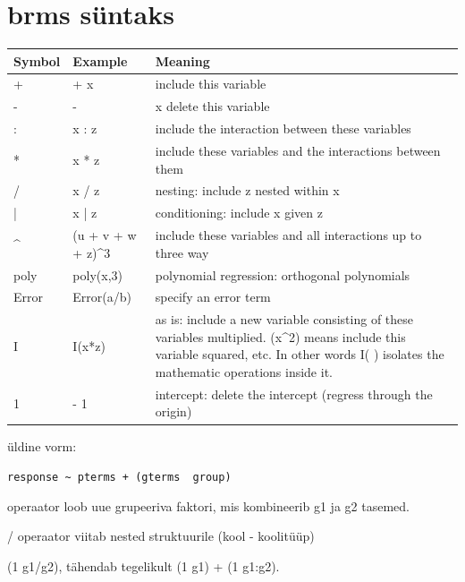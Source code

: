 \documentclass[]{book}
\providecommand{\tightlist}{%
  \setlength{\itemsep}{0pt}\setlength{\parskip}{0pt}}
\begin{document}
\hypertarget{brms-suntaks}{%
\chapter{brms süntaks}\label{brms-suntaks}}

\begin{tabular}{l|l|l}
\hline
Symbol & Example & Meaning\\
\hline
+ & + x & include this variable\\
\hline
- & - & x   delete this variable\\
\hline
: & x : z & include the interaction between these variables\\
\hline
* & x * z & include these variables and the interactions between them\\
\hline
/ & x / z & nesting: include z nested within x\\
\hline
| & x | z & conditioning: include x given z\\
\hline
\textasciicircum{} & (u + v + w + z)\textasciicircum{}3 & include these variables and all interactions up to three way\\
\hline
poly & poly(x,3) & polynomial regression: orthogonal polynomials\\
\hline
Error & Error(a/b) & specify an error term\\
\hline
I & I(x*z) & as is: include a new variable consisting of these variables multiplied. (x\textasciicircum{}2) means include this variable squared, etc. In other words I( ) isolates the mathematic operations inside it.\\
\hline
1 & - 1 & intercept: delete the intercept (regress through the origin)\\
\hline
\end{tabular}

üldine vorm:

\texttt{response\ \textasciitilde{}\ pterms\ +\ (gterms\ \textbar{}\ group)}

\begin{description}
\tightlist
\item[kasuta g1:g2 või g1/g2, kui nii g1 kui g2 on sobilikud grupeerivad faktorid.]
operaator loob uue grupeeriva faktori, mis kombineerib g1 ja g2 tasemed.
\end{description}

/ operaator viitab nested struktuurile (kool - koolitüüp)

(1 \textbar{} g1/g2), tähendab tegelikult (1 \textbar{} g1) + (1 \textbar{} g1:g2).
\end{document}
